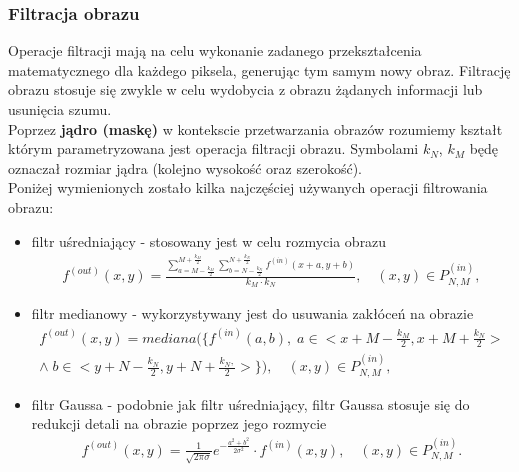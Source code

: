 \subsubsection{Filtracja obrazu}
Operacje filtracji mają na celu wykonanie zadanego przekształcenia matematycznego dla każdego piksela, generując tym samym nowy obraz. Filtrację obrazu stosuje się zwykle w celu wydobycia z obrazu żądanych informacji lub usunięcia szumu. \\
Poprzez \textbf{jądro (maskę)} w kontekscie przetwarzania obrazów rozumiemy kształt którym parametryzowana jest operacja filtracji obrazu. Symbolami $k_N$, $k_M$ będę oznaczał rozmiar jądra (kolejno wysokość oraz szerokość).\\
Poniżej wymienionych zostało kilka najczęściej używanych operacji filtrowania obrazu:
\begin{itemize}
\item filtr uśredniający - stosowany jest w celu rozmycia obrazu
  \begin{gather*}
    f^{(out)}(x, y) = \frac{\sum\limits_{a=M-\frac{k_M}{2}}^{M+\frac{k_M}{2}} \sum\limits_{b=N-\frac{k_N}{2}}^{N+\frac{k_N}{2}} f^{(in)}(x + a, y + b)}{k_M \cdot k_N}, \quad (x, y) \in P^{(in)}_{N,M},
  \end{gather*}
\item filtr medianowy - wykorzystywany jest do usuwania zakłóceń na obrazie
  \begin{gather*}
    f^{(out)}(x, y) = mediana(\{f^{(in)}(a, b), \;a \in \big< x + M-\frac{k_M}{2}, x + M+\frac{k_N}{2}\big> \\
    \wedge\; b \in \big< y + N-\frac{k_N}{2}, y + N+\frac{k_N,}{2}\big>\}), \quad (x, y) \in P^{(in)}_{N,M},
  \end{gather*}
\item filtr Gaussa - podobnie jak filtr uśredniający, filtr Gaussa stosuje się do redukcji detali na obrazie poprzez jego rozmycie
  \begin{gather*}
    f^{(out)}(x, y) = \frac{1}{\sqrt{2 \pi \sigma}} e^{-\frac{a^2+b^2}{2 \sigma^2}} \cdot f^{(in)}(x, y), \quad (x, y) \in P^{(in)}_{N,M}.
  \end{gather*}
\end{itemize}

